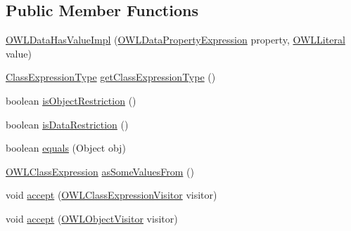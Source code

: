 \subsection*{Public Member Functions}
\begin{DoxyCompactItemize}
\item 
\hyperlink{classuk_1_1ac_1_1manchester_1_1cs_1_1owl_1_1owlapi_1_1_o_w_l_data_has_value_impl_ab32dfaaf3e62763b4def3f3e13cdbb76}{O\-W\-L\-Data\-Has\-Value\-Impl} (\hyperlink{interfaceorg_1_1semanticweb_1_1owlapi_1_1model_1_1_o_w_l_data_property_expression}{O\-W\-L\-Data\-Property\-Expression} property, \hyperlink{interfaceorg_1_1semanticweb_1_1owlapi_1_1model_1_1_o_w_l_literal}{O\-W\-L\-Literal} value)
\item 
\hyperlink{enumorg_1_1semanticweb_1_1owlapi_1_1model_1_1_class_expression_type}{Class\-Expression\-Type} \hyperlink{classuk_1_1ac_1_1manchester_1_1cs_1_1owl_1_1owlapi_1_1_o_w_l_data_has_value_impl_ab908357f2804f92635b17cf2bce8a1a8}{get\-Class\-Expression\-Type} ()
\item 
boolean \hyperlink{classuk_1_1ac_1_1manchester_1_1cs_1_1owl_1_1owlapi_1_1_o_w_l_data_has_value_impl_a85aa57b9ce570b28dc47e1c6f9b3e22c}{is\-Object\-Restriction} ()
\item 
boolean \hyperlink{classuk_1_1ac_1_1manchester_1_1cs_1_1owl_1_1owlapi_1_1_o_w_l_data_has_value_impl_ab9c25b33acdd9e6687e971d866f4b101}{is\-Data\-Restriction} ()
\item 
boolean \hyperlink{classuk_1_1ac_1_1manchester_1_1cs_1_1owl_1_1owlapi_1_1_o_w_l_data_has_value_impl_af21fd0c7f421d35ae1673b62cf41c856}{equals} (Object obj)
\item 
\hyperlink{interfaceorg_1_1semanticweb_1_1owlapi_1_1model_1_1_o_w_l_class_expression}{O\-W\-L\-Class\-Expression} \hyperlink{classuk_1_1ac_1_1manchester_1_1cs_1_1owl_1_1owlapi_1_1_o_w_l_data_has_value_impl_a3ec0e74ae64f25474b951162a5beb422}{as\-Some\-Values\-From} ()
\item 
void \hyperlink{classuk_1_1ac_1_1manchester_1_1cs_1_1owl_1_1owlapi_1_1_o_w_l_data_has_value_impl_a2fa1722ca2db44517dc902b3e1e460f4}{accept} (\hyperlink{interfaceorg_1_1semanticweb_1_1owlapi_1_1model_1_1_o_w_l_class_expression_visitor}{O\-W\-L\-Class\-Expression\-Visitor} visitor)
\item 
void \hyperlink{classuk_1_1ac_1_1manchester_1_1cs_1_1owl_1_1owlapi_1_1_o_w_l_data_has_value_impl_a7872be516b5df00342f30dca67dceca7}{accept} (\hyperlink{interfaceorg_1_1semanticweb_1_1owlapi_1_1model_1_1_o_w_l_object_visitor}{O\-W\-L\-Object\-Visitor} visitor)
\end{DoxyCompactItemize}
